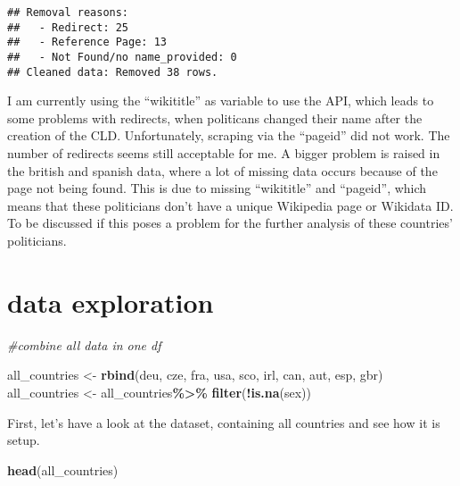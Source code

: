 \documentclass[
]{article}
\newenvironment{Shaded}{\begin{snugshade}}{\end{snugshade}}
\newcommand{\CommentTok}[1]{\textcolor[rgb]{0.56,0.35,0.01}{\textit{#1}}}
\newcommand{\FunctionTok}[1]{\textcolor[rgb]{0.13,0.29,0.53}{\textbf{#1}}}
\newcommand{\NormalTok}[1]{#1}
\newcommand{\OtherTok}[1]{\textcolor[rgb]{0.56,0.35,0.01}{#1}}
\newcommand{\SpecialCharTok}[1]{\textcolor[rgb]{0.81,0.36,0.00}{\textbf{#1}}}
\begin{document}
\begin{verbatim}
## Removal reasons:
##   - Redirect: 25 
##   - Reference Page: 13 
##   - Not Found/no name_provided: 0 
## Cleaned data: Removed 38 rows.
\end{verbatim}

I am currently using the ``wikititle'' as variable to use the API, which
leads to some problems with redirects, when politicans changed their
name after the creation of the CLD. Unfortunately, scraping via the
``pageid'' did not work. The number of redirects seems still acceptable
for me. A bigger problem is raised in the british and spanish data,
where a lot of missing data occurs because of the page not being found.
This is due to missing ``wikititle'' and ``pageid'', which means that
these politicians don't have a unique Wikipedia page or Wikidata ID. To
be discussed if this poses a problem for the further analysis of these
countries' politicians.

\hypertarget{data-exploration}{%
\section{data exploration}\label{data-exploration}}

\begin{Shaded}
\begin{Highlighting}[]
\CommentTok{\#combine all data in one df}

\NormalTok{all\_countries }\OtherTok{\textless{}{-}} \FunctionTok{rbind}\NormalTok{(deu, cze, fra, usa, sco, irl, can, aut, esp, gbr)}
\NormalTok{all\_countries }\OtherTok{\textless{}{-}}\NormalTok{ all\_countries}\SpecialCharTok{\%\textgreater{}\%}
  \FunctionTok{filter}\NormalTok{(}\SpecialCharTok{!}\FunctionTok{is.na}\NormalTok{(sex))}
\end{Highlighting}
\end{Shaded}

First, let's have a look at the dataset, containing all countries and
see how it is setup.

\begin{Shaded}
\begin{Highlighting}[]
\FunctionTok{head}\NormalTok{(all\_countries)}
\end{Highlighting}
\end{Shaded}
\end{document}

